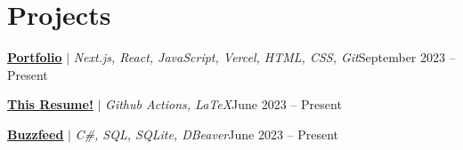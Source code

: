 
\section{Projects}

\resumeSubHeadingListStart
\resumeProjectHeading

{\textbf{\href{https://jaychen.app}{\underline{Portfolio}}} $|$ \emph{Next.js, React, JavaScript, Vercel, HTML, CSS, Git}}{September 2023 -- Present}
\resumeItemListStart


\resumeItemListEnd
\resumeProjectHeading

{\textbf{\href{https://github.com/jundachen10/jays_resume}{\underline{This Resume!}}} $|$ \emph{Github Actions, LaTeX}}{June 2023 -- Present}
\resumeItemListStart


\resumeItemListEnd
\resumeProjectHeading

{\textbf{\href{https://github.com/jundachen10/buzzfeed}{\underline{Buzzfeed}}} $|$ \emph{C\#, SQL, SQLite, DBeaver}}{June 2023 -- Present}
\resumeItemListStart


\resumeItemListEnd
\resumeSubHeadingListEnd
